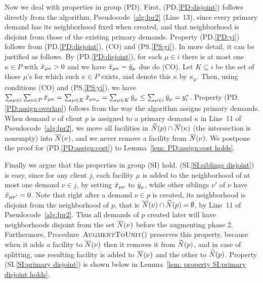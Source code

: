 \documentclass{llncs}
\begin{document}
Now we deal with properties in group (PD).  First,
(PD.\ref{PD:disjoint}) follows directly from the algorithm,
Pseudocode~\ref{alg:lpr2} (Line~13), since every primary demand has
its neighborhood fixed when created, and that neighborhood is disjoint
from those of the existing primary demands. Property (PD.\ref{PD:yi})
follows from (PD.\ref{PD:disjoint}), (CO) and (PS.\ref{PS:yi}). In
more detail, it can be justified as follows. By
(PD.\ref{PD:disjoint}), for each $\mu\in i$ there is at most one
$\kappa\in P$ with ${\bar x}_{\mu\kappa} > 0$ and we have
${\bar x}_{\mu\kappa} = {\bar y}_{\mu}$ due do (CO).  Let $K\subseteq i$ be
the set of those $\mu$'s for which such $\kappa\in P$ exists, and
denote this $\kappa$ by $\kappa_\mu$. Then, using conditions (CO) and
(PS.\ref{PS:yi}), we have $ \sum_{\mu\in i}\sum_{\kappa\in
  P}{\bar x}_{\mu\kappa} = \sum_{\mu\in K}{\bar x}_{\mu\kappa_\mu} =
\sum_{\mu\in K}{\bar y}_{\mu} \leq \sum_{\mu\in i} {\bar y}_{\mu} =
y_i^\ast$. Property (PD.\ref{PD:assign:overlap}) follows from the way
the algorithm assigns primary demands.  When demand $\nu$ of client
$p$ is assigned to a primary demand $\kappa$ in Line~11 of
Pseudocode~\ref{alg:lpr2}, we move all facilities in ${\widetilde N}(p)\cap
{\overline{N}}(\kappa)$ (the intersection is nonempty) into ${\overline{N}}(\nu)$, and
we never remove a facility from ${\overline{N}}(\nu)$.  We postpone the proof
for (PD.\ref{PD:assign:cost}) to Lemma~\ref{lem: PD:assign:cost
  holds}.

Finally we argue that the properties in group (SI)
hold. (SI.\ref{SI:siblings disjoint}) is easy, since for any client
$j$, each facility $\mu$ is added to the neighborhood of at most one
demand $\nu\in j$, by setting ${\bar x}_{\mu\nu}$ to ${\bar y}_\mu$, while
other siblings $\nu'$ of $\nu$ have ${\bar x}_{\mu\nu'}=0$. Note that
right after a demand $\nu\in p$ is created, its neighborhood is
disjoint from the neighborhood of $p$, that is ${\overline{N}}(\nu)\cap
{\widetilde N}(p) = \emptyset$, by Line~11 of
Pseudocode~\ref{alg:lpr2}. Thus all demands of $p$ created later will
have neighborhoods disjoint from the set ${\overline{N}}(\nu)$ before the
augmenting phase 2. Furthermore, Procedure~${\textsc{AugmentToUnit}}()$
preserves this property, because when it adds a facility to
${\overline{N}}(\nu)$ then it removes it from ${\widetilde N}(p)$, and in case of
splitting, one resulting facility is added to ${\overline{N}}(\nu)$ and the
other to ${\widetilde N}(p)$. Property (SI.\ref{SI:primary disjoint}) is
shown below in Lemma~\ref{lem: property SI:primary disjoint holds}.

\end{document}
